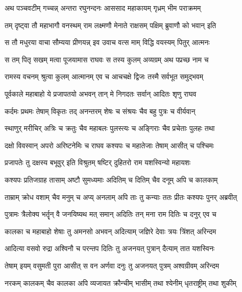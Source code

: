 
\twolineshloka
{अथ पञ्चवटीम् गच्चन्न् अन्तरा रघुनन्दनः}
{आससाद महाकायम् गृध्रम् भीम पराक्रमम्} %

\twolineshloka
{तम् दृष्ट्वा तौ महाभागौ वनस्थम् राम लक्ष्मणौ}
{मेनाते राक्षसम् पक्षिम् ब्रुवाणौ को भवान् इति} %

\twolineshloka
{स तौ मधुरया वाचा सौम्यया प्रीणयन्न् इव}
{उवाच वत्स माम् विद्धि वयस्यम् पितुर् आत्मनः} %

\twolineshloka
{स तम् पितृ सखम् मत्वा पूजयामास राघवः}
{स तस्य कुलम् अव्यग्रम् अथ पप्रच्छ नाम च} %

\twolineshloka
{रामस्य वचनम् श्रुत्वा कुलम् आत्मानम् एव च}
{आचचक्षे द्विजः तस्मै सर्वभूत समुद्भवम्} %

\twolineshloka
{पूर्वकाले महाबाहो ये प्रजापतयो अभवन्}
{तान् मे निगदतः सर्वान् आदितः शृणु राघव} %

\twolineshloka
{कर्दमः प्रथमः तेषाम् विकृतः तद् अनन्तरम्}
{शेषः च संश्रयः चैव बहु पुत्रः च वीर्यवान्} %

\twolineshloka
{स्थाणुर् मरीचिर् अत्रिः च क्रतुः चैव महाबलः}
{पुलस्त्यः च अङ्गिराः चैव प्रचेताः पुलहः तथा} %

\twolineshloka
{दक्षो विवस्वान् अपरो अरिष्टनेमिः च राघव}
{कश्यपः च महातेजाः तेषाम् आसीत् च पश्चिमः} %

\twolineshloka
{प्रजापतेः तु दक्षस्य बभूवुर् इति विश्रुतम्}
{षष्टिर् दुहितरो राम यशस्विन्यो महायशः} %

\twolineshloka
{कश्यपः प्रतिजग्राह तासाम् अष्टौ सुमध्यमाः}
{अदितिम् च दितिम् चैव दनूम् अपि च कालकाम्} %

\twolineshloka
{ताम्राम् क्रोध वशाम् चैव मनुम् च अप्य् अनलाम् अपि}
{ताः तु कन्याः ततः प्रीतः कश्यपः पुनर् अब्रवीत्} %

\twolineshloka
{पुत्रामः त्रैलोक्य भर्तॄन् वै जनयिष्यथ मत् समान्}
{अदितिः तन् मना राम दितिः च दनुर् एव च} %

\twolineshloka
{कालका च महाबाहो शेषाः तु अमनसो अभवन्}
{अदित्याम् जज्ञिरे देवाः त्रयः त्रिंशत् अरिन्दम} %

\twolineshloka
{आदित्या वसवो रुद्रा अश्विनौ च परन्तप}
{दितिः तु अजनयत् पुत्रान् दैत्याम् तात यशस्विनः} %

\twolineshloka
{तेषाम् इयम् वसुमती पुरा आसीत् स वन अर्णवा}
{दनुः तु अजनयत् पुत्रम् अश्वग्रीवम् अरिन्दम} %

\twolineshloka
{नरकम् कालकम् चैव कालका अपि व्यजायत}
{क्रौन्चीम् भासीम् तथा श्येनीम् धृतराष्ट्रीम् तथा शुकीम्} %

